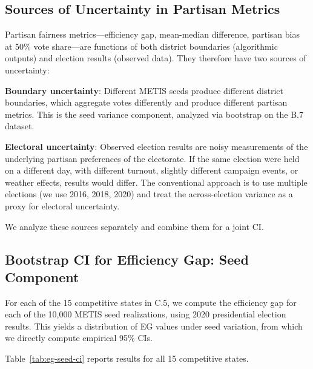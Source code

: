 
\subsection{Sources of Uncertainty in Partisan Metrics}

Partisan fairness metrics---efficiency gap, mean-median difference,
partisan bias at 50\% vote share---are functions of both district
boundaries (algorithmic outputs) and election results (observed data).
They therefore have two sources of uncertainty:

\textbf{Boundary uncertainty}: Different METIS seeds produce different
district boundaries, which aggregate votes differently and produce
different partisan metrics. This is the seed variance component,
analyzed via bootstrap on the B.7 dataset.

\textbf{Electoral uncertainty}: Observed election results are noisy
measurements of the underlying partisan preferences of the electorate.
If the same election were held on a different day, with different
turnout, slightly different campaign events, or weather effects, results
would differ. The conventional approach is to use multiple elections
(we use 2016, 2018, 2020) and treat the across-election variance as
a proxy for electoral uncertainty.

We analyze these sources separately and combine them for a joint CI.

\subsection{Bootstrap CI for Efficiency Gap: Seed Component}

For each of the 15 competitive states in C.5, we compute the efficiency
gap for each of the 10,000 METIS seed realizations, using 2020
presidential election results. This yields a distribution of EG values
under seed variation, from which we directly compute empirical 95\% CIs.

Table~\ref{tab:eg-seed-ci} reports results for all 15 competitive states.


